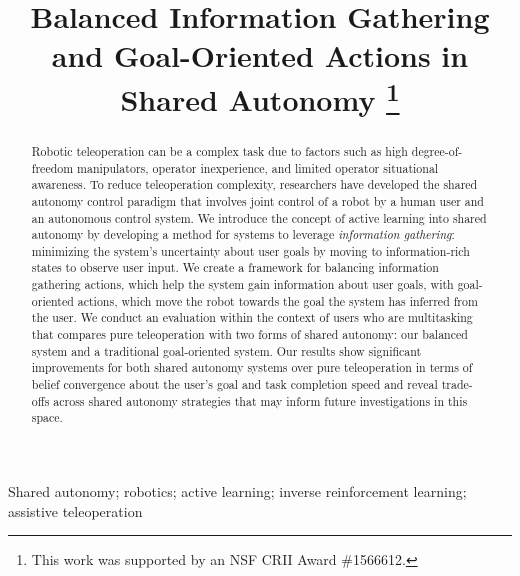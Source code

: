 \documentclass[conference]{IEEEtran}
\begin{document}
\title{Balanced Information Gathering and Goal-Oriented Actions in Shared Autonomy
\thanks{This work was supported by an NSF CRII Award \#1566612.}
}

\author{
\and
{}
}
\maketitle

\begin{abstract}
Robotic teleoperation can be a complex task due to factors such as high degree-of-freedom manipulators, operator inexperience, and limited operator situational awareness. To reduce teleoperation complexity, researchers have developed the shared autonomy control paradigm that involves joint control of a robot by a human user and an autonomous control system. We introduce the concept of active learning into shared autonomy by developing a method for systems to leverage \textit{information gathering}: minimizing the system's uncertainty about user goals by moving to information-rich states to observe user input. We create a framework for balancing information gathering actions, which help the system gain information about user goals, with goal-oriented actions, which move the robot towards the goal the system has inferred from the user. We conduct an evaluation within the context of users who are multitasking that compares pure teleoperation with two forms of shared autonomy: our balanced system and a traditional goal-oriented system. Our results show significant improvements for both shared autonomy systems over pure teleoperation in terms of belief convergence about the user's goal and task completion speed and reveal trade-offs across shared autonomy strategies that may inform future investigations in this space.
\end{abstract}

\begin{IEEEkeywords}
Shared autonomy; robotics; active learning; inverse reinforcement learning; assistive teleoperation
\end{IEEEkeywords}
\end{document}

